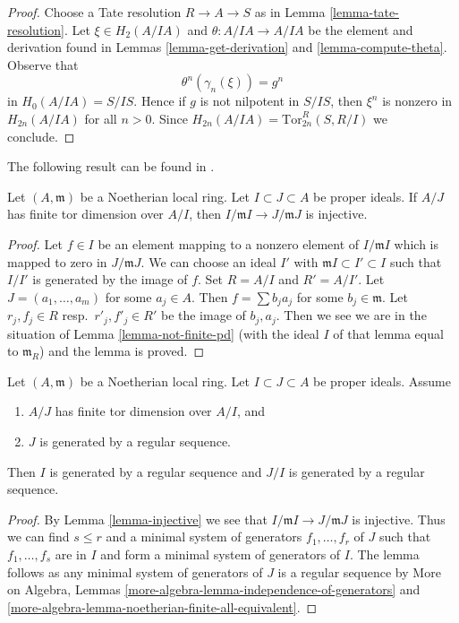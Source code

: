 \begin{proof}
Choose a Tate resolution $R \to A \to S$ as in
Lemma \ref{lemma-tate-resolution}.
Let $\xi \in H_2(A/IA)$ and $\theta : A/IA \to A/IA$ be the element
and derivation found in Lemmas \ref{lemma-get-derivation} and
\ref{lemma-compute-theta}.
Observe that
$$
\theta^n(\gamma_n(\xi)) = g^n
$$
in $H_0(A/IA) = S/IS$.
Hence if $g$ is not nilpotent in $S/IS$, then $\xi^n$ is nonzero in
$H_{2n}(A/IA)$ for all $n > 0$. Since
$H_{2n}(A/IA) = \text{Tor}^R_{2n}(S, R/I)$ we conclude.
\end{proof}

\noindent
The following result can be found in \cite{Rodicio}.

\begin{lemma}
\label{lemma-injective}
Let $(A, \mathfrak m)$ be a Noetherian local ring. Let
$I \subset J \subset A$ be proper ideals. If $A/J$ has finite
tor dimension over $A/I$, then $I/\mathfrak m I \to J/\mathfrak m J$
is injective.
\end{lemma}

\begin{proof}
Let $f \in I$ be an element mapping to a nonzero element of $I/\mathfrak m I$
which is mapped to zero in $J/\mathfrak mJ$. We can choose an ideal $I'$
with $\mathfrak mI \subset I' \subset I$ such that $I/I'$ is generated by
the image of $f$. Set $R = A/I$ and $R' = A/I'$. Let $J = (a_1, \ldots, a_m)$
for some $a_j \in A$. Then $f = \sum b_j a_j$ for some $b_j \in \mathfrak m$.
Let $r_j, f_j \in R$ resp.\ $r'_j, f'_j \in R'$ be the image of $b_j, a_j$.
Then we see we are
in the situation of Lemma \ref{lemma-not-finite-pd}
(with the ideal $I$ of that lemma equal to $\mathfrak m_R$)
and the lemma is proved.
\end{proof}

\begin{lemma}
\label{lemma-regular-sequence}
Let $(A, \mathfrak m)$ be a Noetherian local ring. Let
$I \subset J \subset A$ be proper ideals. Assume
\begin{enumerate}
\item $A/J$ has finite tor dimension over $A/I$, and
\item $J$ is generated by a regular sequence.
\end{enumerate}
Then $I$ is generated by a regular sequence and $J/I$
is generated by a regular sequence.
\end{lemma}

\begin{proof}
By Lemma \ref{lemma-injective} we see that
$I/\mathfrak m I \to J/\mathfrak m J$
is injective. Thus we can find $s \leq r$ and a minimal system of
generators $f_1, \ldots, f_r$ of $J$ such that $f_1, \ldots, f_s$ are in $I$
and form a minimal system of generators of $I$.
The lemma follows as any minimal system of generators of $J$
is a regular sequence by
More on Algebra, Lemmas
\ref{more-algebra-lemma-independence-of-generators} and
\ref{more-algebra-lemma-noetherian-finite-all-equivalent}.
\end{proof}

